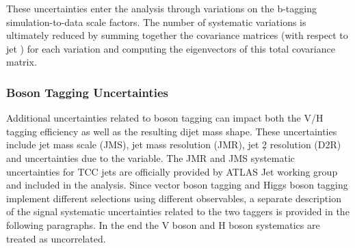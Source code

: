 These uncertainties enter the analysis through variations on the b-tagging simulation-to-data scale factors.
The number of systematic variations is ultimately reduced by summing together the covariance matrices (with respect to jet \pt) for each variation and computing the eigenvectors of this total covariance matrix.

\subsubsection{Boson Tagging Uncertainties}
\label{sec:syst-boson}
Additional uncertainties related to boson tagging can impact both the V/H tagging efficiency as well as the resulting dijet mass shape.
These uncertainties include jet mass scale (JMS), jet mass resolution (JMR), jet \d2 resolution (D2R) and uncertainties due to the \ntrk variable.
The JMR and JMS systematic uncertainties for TCC jets are officially provided by ATLAS Jet working group and included in the analysis.
Since vector boson tagging and Higgs boson tagging implement different selections using different observables, a separate description of the signal systematic uncertainties related to the two taggers is provided in the following paragraphs.
In the end the V boson and H boson systematics are treated as uncorrelated.

